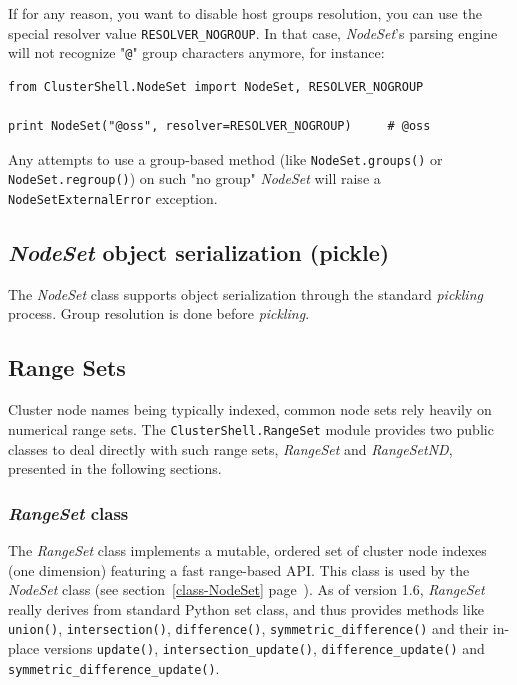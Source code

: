 \documentclass[english,a4paper]{csuserguide}
\newcommand{\NodeSet}{\textit{NodeSet}\xspace}
\newcommand{\RangeSet}{\textit{RangeSet}\xspace}
\newcommand{\RangeSetND}{\textit{RangeSetND}\xspace}
\begin{document}
If for any reason, you want to disable host groups resolution, you can use the special resolver value \lstinline+RESOLVER_NOGROUP+. In that case, \NodeSet's parsing engine will not recognize "\verb+@+" group characters anymore, for instance:
\medskip
\begin{lstlisting}[breaklines=true, breakatwhitespace=true]
from ClusterShell.NodeSet import NodeSet, RESOLVER_NOGROUP

print NodeSet("@oss", resolver=RESOLVER_NOGROUP)     # @oss
\end{lstlisting}

Any attempts to use a group-based method (like \lstinline+NodeSet.groups()+ or \lstinline+NodeSet.regroup()+) on such "no group" \NodeSet will raise a \texttt{NodeSetExternalError} exception.


\subsection{\NodeSet object serialization (pickle)}

The \NodeSet class supports object serialization through the standard \textit{pickling} process. Group resolution is done before \textit{pickling}.


\subsection{Range Sets}
\label{module-RangeSet}

Cluster node names being typically indexed, common node sets rely heavily on numerical range sets.
The \verb+ClusterShell.RangeSet+ module provides two public classes to deal directly with such range sets, \RangeSet and \RangeSetND, presented in the following sections.

\subsubsection{\RangeSet class}
\label{class-RangeSet}

The \RangeSet class implements a mutable, ordered set of cluster node indexes (one dimension) featuring a fast range-based API. This class is used by the \NodeSet class (see section~\ref{class-NodeSet} page~\pageref{class-NodeSet}). As of version 1.6, \RangeSet really derives from standard Python set class, and thus provides methods like \lstinline+union()+, \lstinline+intersection()+, \lstinline+difference()+, \lstinline+symmetric_difference()+ and their in-place versions \lstinline+update()+, \lstinline+intersection_update()+, \lstinline+difference_update()+ and \lstinline+symmetric_difference_update()+.
\end{document}
